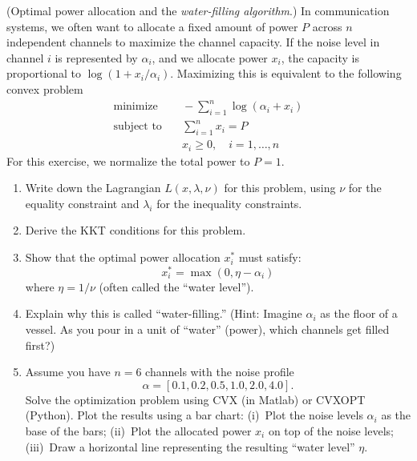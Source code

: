 \begin{myexercise}
(Optimal power allocation and the {\em water-filling algorithm}.)
In communication systems, we often want to allocate a fixed amount of power $P$ across $n$ independent channels to maximize the channel capacity. If the noise level in channel $i$ is represented by $\alpha_i$, and we allocate power $x_i$, the capacity is proportional to $\log(1 + x_i/\alpha_i)$. Maximizing this is equivalent to the following convex problem
\begin{align*}
\text{minimize} & \quad -\sum_{i=1}^n \log(\alpha_i + x_i) \\
\text{subject to} & \quad \sum_{i=1}^n x_i = P \\
& \quad x_i \geq 0, \quad i=1, \dots, n
\end{align*}
For this exercise, we normalize the total power to $P=1$.

\begin{enumerate}
\item  Write down the Lagrangian $L(x, \lambda, \nu)$ for this problem, using $\nu$ for the equality constraint and $\lambda_i$ for the inequality constraints.
\item  Derive the KKT conditions for this problem.
\item Show that the optimal power allocation $x_i^*$ must satisfy:
   $$x_i^* = \max(0, \eta - \alpha_i)$$
   where $\eta = 1/\nu$ (often called the ``water level'').
\item Explain why this is called ``water-filling.'' (Hint: Imagine $\alpha_i$ as the floor of a vessel. As you pour in a unit of ``water'' (power), which channels get filled first?)
\item Assume you have $n = 6$ channels with the noise profile 
$$\alpha = [0.1, 0.2, 0.5, 1.0, 2.0, 4.0].$$
Solve the optimization problem using CVX (in Matlab) or CVXOPT (Python). Plot the results using a bar chart: (i)~Plot the noise levels $\alpha_i$ as the base of the bars; (ii)~Plot the allocated power $x_i$ on top of the noise levels; (iii)~Draw a horizontal line representing the resulting ``water level'' $\eta$.
\end{enumerate}



\end{myexercise}
